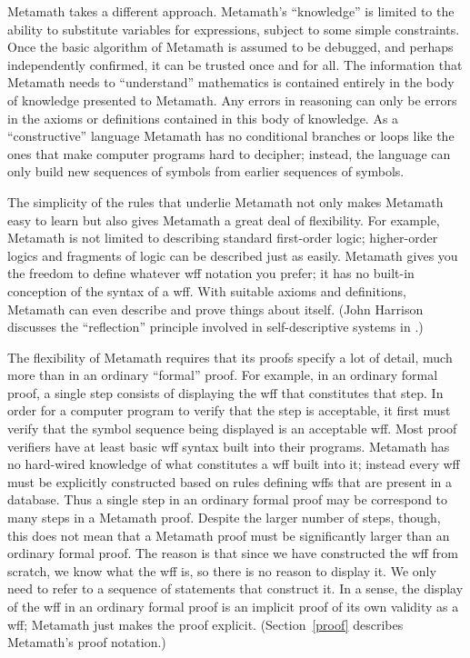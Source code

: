 Metamath takes a different approach.  Metamath's ``knowledge''
is limited to the ability to substitute variables for expressions, subject to
some simple constraints.  Once the basic algorithm of Metamath is assumed to
be debugged, and perhaps independently confirmed, it
can be trusted once and for all.  The information that Metamath needs to
``understand'' mathematics is contained entirely in the body of knowledge
presented to Metamath.  Any errors in reasoning can only be errors in the
axioms or definitions contained in this body of knowledge.  As a
``constructive'' language Metamath has no
conditional branches or loops like the ones that make computer programs hard
to decipher; instead, the language can only build new sequences of symbols
from earlier sequences  of symbols.

The simplicity of the rules that underlie Metamath not only makes Metamath
easy to learn but also gives Metamath a great deal of flexibility. For
example, Metamath is not limited to describing standard first-order
logic; higher-order logics
and fragments of logic can be described just as easily.
Metamath gives you the freedom to define whatever wff notation you prefer; it
has no built-in conception of the syntax of a wff.  With suitable axioms and definitions, Metamath can even describe and
prove things about itself.  (John
Harrison discusses the ``reflection''
principle involved in self-descriptive systems in
\cite{Harrison}.)

The flexibility of Metamath requires that its proofs specify a lot of detail,
much more than in an ordinary ``formal'' proof.  For
example, in an ordinary formal proof, a single step consists of displaying the
wff that constitutes that step.  In order for a computer program to verify
that the step is acceptable, it first must verify that the symbol sequence
being displayed is an acceptable wff. Most
proof verifiers have at least basic wff syntax built into their programs.
Metamath has no hard-wired knowledge of what constitutes a wff built into it;
instead every wff must be explicitly constructed based on rules defining wffs
that are present in a database.  Thus a single step in an ordinary formal
proof may be correspond to many steps in a Metamath proof. Despite the larger
number of steps, though, this does not mean that a Metamath proof must be
significantly larger than an ordinary formal proof. The reason is that since
we have constructed the wff from scratch, we know what the wff is, so there is
no reason to display it.  We only need to refer to a sequence of statements
that construct it.  In a sense, the display of the wff in an ordinary formal
proof is an implicit proof of its own validity as a wff; Metamath just makes
the proof explicit. (Section~\ref{proof} describes Metamath's proof notation.)

